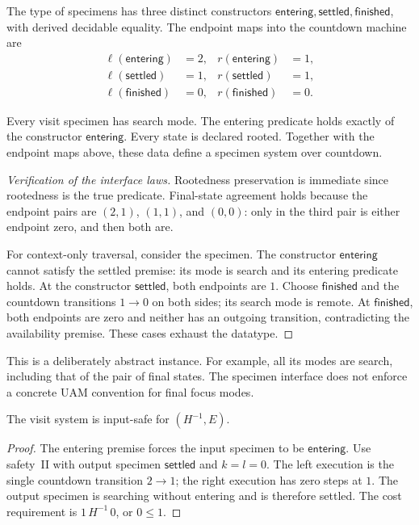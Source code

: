 \begin{definition}
The type of specimens has three distinct constructors
$\mathsf{entering},\mathsf{settled},\mathsf{finished}$, with derived
decidable equality. The endpoint maps into the countdown machine are
\[
 \begin{aligned}
 \ell(\mathsf{entering})&=2,& r(\mathsf{entering})&=1,\\
 \ell(\mathsf{settled})&=1,& r(\mathsf{settled})&=1,\\
 \ell(\mathsf{finished})&=0,& r(\mathsf{finished})&=0.
 \end{aligned}
\]
\end{definition}

\begin{definition}
Every visit specimen has search mode. The entering predicate holds
exactly of the constructor $\mathsf{entering}$. Every state is declared
rooted. Together with the endpoint maps above, these data define a
specimen system over countdown.
\end{definition}
\begin{proof}[Verification of the interface laws]
Rootedness preservation is immediate since rootedness is the true
predicate. Final-state agreement holds because the endpoint pairs are
$(2,1)$, $(1,1)$, and $(0,0)$: only in the third pair is either endpoint
zero, and then both are.

For context-only traversal, consider the specimen. The constructor
$\mathsf{entering}$ cannot satisfy the settled premise: its mode is
search and its entering predicate holds. At the constructor
$\mathsf{settled}$, both endpoints are $1$. Choose
$\mathsf{finished}$ and the countdown transitions $1\to0$ on both
sides; its search mode is remote. At $\mathsf{finished}$, both
endpoints are zero and neither has an outgoing transition, contradicting
the availability premise. These cases exhaust the datatype.
\end{proof}
This is a deliberately abstract instance. For example, all its modes are
search, including that of the pair of final states. The specimen interface
does not enforce a concrete UAM convention for final focus modes.

\begin{lemma}
The visit system is input-safe for $(H^{-1},E)$.
\end{lemma}
\begin{proof}
The entering premise forces the input specimen to be
$\mathsf{entering}$. Use safety~II with output specimen
$\mathsf{settled}$ and $k=l=0$. The left execution is the single
countdown transition $2\to1$; the right execution has zero steps at
$1$. The output specimen is searching without entering and is therefore
settled. The cost requirement is $1\,H^{-1}\,0$, or $0\leq1$.
\end{proof}

